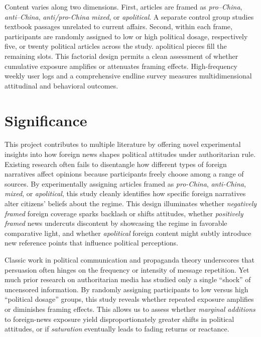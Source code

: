 \documentclass[12pt, american]{article}
\begin{document}
Content varies along two dimensions. First, articles are framed as \textit{pro–China}, \textit{anti–China}, \textit{anti/pro-China mixed}, or \textit{apolitical}. A separate control group studies textbook passages unrelated to current affairs. Second, within each frame, participants are randomly assigned to low or high political dosage, respectively five, or twenty political articles across the study. apolitical pieces fill the remaining slots. This factorial design permits a clean assessment of whether cumulative exposure amplifies or attenuates framing effects. High-frequency weekly user logs and a comprehensive endline survey measures multidimensional attitudinal and behavioral outcomes.

\section{Significance}

This project contributes to multiple literature by offering novel experimental insights into how foreign news shapes political attitudes under authoritarian rule.
Existing research often fails to disentangle how different types of foreign narratives affect opinions because participants freely choose among a range of sources. By experimentally assigning articles framed as \textit{pro-China}, \textit{anti-China}, \textit{mixed}, or \textit{apolitical}, this study cleanly identifies how specific foreign narratives alter citizens’ beliefs about the regime. This design illuminates whether \textit{negatively framed} foreign coverage sparks backlash or shifts attitudes, whether \textit{positively framed} news undercuts discontent by showcasing the regime in favorable comparative light, and whether \textit{apolitical} foreign content might subtly introduce new reference points that influence political perceptions.

Classic work in political communication \citep{zaller1992nature} and propaganda theory \citep{petty1986elaboration} underscores that persuasion often hinges on the frequency or intensity of message repetition. Yet much prior research on authoritarian media has studied only a single “shock” of uncensored information. By randomly assigning participants to low versus high “political dosage” groups, this study reveals whether repeated exposure amplifies or diminishes framing effects. This allows us to assess whether \textit{marginal additions} to foreign-news exposure yield disproportionately greater shifts in political attitudes, or if \textit{saturation} eventually leads to fading returns or reactance.
\end{document}
